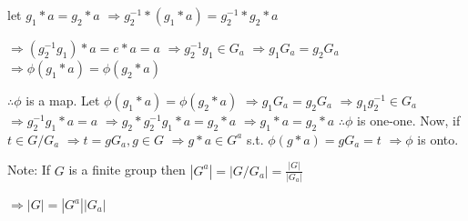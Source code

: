 let $g_1 * a = g_2 * a$
$\Rightarrow g_2^{-1} * (g_1 * a) = g_2^{-1} * g_2 * a$

$\Rightarrow (g_2^{-1} g_1) * a = e * a = a$
$\Rightarrow g_2^{-1} g_1 \in G_a$
$\Rightarrow g_1 G_a = g_2 G_a$
$\Rightarrow \phi(g_1 * a) = \phi(g_2 * a)$

$\therefore \phi$ is a map.
Let $\phi(g_1 * a) = \phi(g_2 * a)$
$\Rightarrow g_1 G_a = g_2 G_a$
$\Rightarrow g_1 g_2^{-1} \in G_a$
$\Rightarrow g_2^{-1} g_1 * a = a$
$\Rightarrow g_2 * g_2^{-1} g_1 * a = g_2 * a$
$\Rightarrow g_1 * a = g_2 * a$
$\therefore \phi$ is one-one.
Now,
if $t \in G/G_a$
$\Rightarrow t = g G_a, g \in G$
$\Rightarrow g * a \in G^a$ s.t. $\phi(g * a) = g G_a = t$
$\Rightarrow \phi$ is onto.

Note: If $G$ is a finite group then
$|G^a| = |G/G_a| = \frac{|G|}{|G_a|}$

$\Rightarrow |G| = |G^a| |G_a|$
